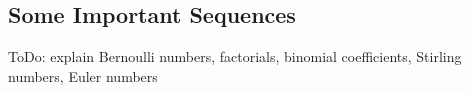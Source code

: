 




\subsection{Some Important Sequences} 
ToDo: explain Bernoulli numbers, factorials, binomial coefficients, Stirling numbers, Euler numbers











\begin{comment}









\end{comment}